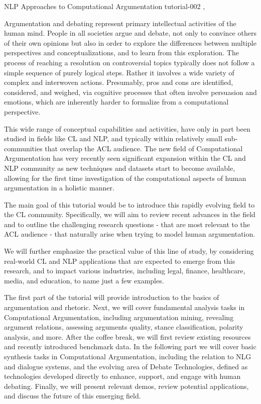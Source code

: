 \begin{tutorial}
  {NLP Approaches to Computational Argumentation}
  {tutorial-002}
  {\daydateyear, \tutorialmorningtime}
  {\TutLocB}

Argumentation and debating represent primary intellectual activities of the human mind. People in all societies argue and debate, not only to convince others of their own opinions but also in order to explore the differences between multiple perspectives and conceptualizations, and to learn from this exploration. The process of reaching a resolution on controversial topics typically does not follow a simple sequence of purely logical steps. Rather it involves a wide variety of complex and interwoven actions. Presumably, pros and cons are identified, considered, and weighed, via cognitive processes that often involve persuasion and emotions, which are inherently harder to formalize from a computational perspective.

This wide range of conceptual capabilities and activities, have only in part been studied in fields like CL and NLP, and typically within relatively small sub-communities that overlap the ACL audience. The new field of Computational Argumentation has very recently seen significant expansion within the CL and NLP community as new techniques and datasets start to become available, allowing for the first time investigation of the computational aspects of human argumentation in a holistic manner. 

The main goal of this tutorial would be to introduce this rapidly evolving field to the CL community. Specifically, we will aim to review recent advances in the field and to outline the challenging research questions - that are most relevant to the ACL audience - that naturally arise when trying to model human argumentation.

We will further emphasize the practical value of this line of study, by considering real-world CL and NLP applications that are expected to emerge from this research, and to impact various industries, including legal, finance, healthcare, media, and education, to name just a few examples.

The first part of the tutorial will provide introduction to the basics of argumentation and rhetoric. Next, we will cover fundamental analysis tasks in Computational Argumentation, including argumentation mining, revealing argument relations, assessing arguments quality, stance classification, polarity analysis, and more. After the coffee break, we will first review existing resources and recently introduced benchmark data. In the following part we will cover basic synthesis tasks in Computational Argumentation, including the relation to NLG and dialogue systems, and the evolving area of Debate Technologies, defined as technologies developed directly to enhance, support, and engage with human debating. Finally, we will present relevant demos, review potential applications, and discuss the future of this emerging field.

\end{tutorial}

